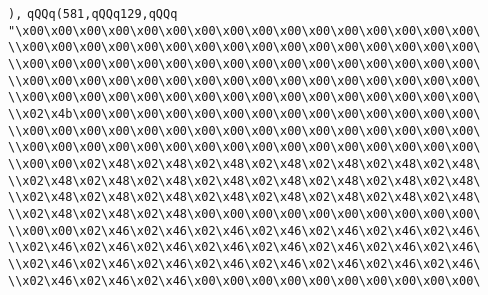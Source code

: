 \verb|),|\newline
\verb|qQQq(581,qQQq129,qQQq|\newline
\verb|"\x00\x00\x00\x00\x00\x00\x00\x00\x00\x00\x00\x00\x00\x00\x00\x00\|\newline
\verb|\\x00\x00\x00\x00\x00\x00\x00\x00\x00\x00\x00\x00\x00\x00\x00\x00\|\newline
\verb|\\x00\x00\x00\x00\x00\x00\x00\x00\x00\x00\x00\x00\x00\x00\x00\x00\|\newline
\verb|\\x00\x00\x00\x00\x00\x00\x00\x00\x00\x00\x00\x00\x00\x00\x00\x00\|\newline
\verb|\\x00\x00\x00\x00\x00\x00\x00\x00\x00\x00\x00\x00\x00\x00\x00\x00\|\newline
\verb|\\x02\x4b\x00\x00\x00\x00\x00\x00\x00\x00\x00\x00\x00\x00\x00\x00\|\newline
\verb|\\x00\x00\x00\x00\x00\x00\x00\x00\x00\x00\x00\x00\x00\x00\x00\x00\|\newline
\verb|\\x00\x00\x00\x00\x00\x00\x00\x00\x00\x00\x00\x00\x00\x00\x00\x00\|\newline
\verb|\\x00\x00\x02\x48\x02\x48\x02\x48\x02\x48\x02\x48\x02\x48\x02\x48\|\newline
\verb|\\x02\x48\x02\x48\x02\x48\x02\x48\x02\x48\x02\x48\x02\x48\x02\x48\|\newline
\verb|\\x02\x48\x02\x48\x02\x48\x02\x48\x02\x48\x02\x48\x02\x48\x02\x48\|\newline
\verb|\\x02\x48\x02\x48\x02\x48\x00\x00\x00\x00\x00\x00\x00\x00\x00\x00\|\newline
\verb|\\x00\x00\x02\x46\x02\x46\x02\x46\x02\x46\x02\x46\x02\x46\x02\x46\|\newline
\verb|\\x02\x46\x02\x46\x02\x46\x02\x46\x02\x46\x02\x46\x02\x46\x02\x46\|\newline
\verb|\\x02\x46\x02\x46\x02\x46\x02\x46\x02\x46\x02\x46\x02\x46\x02\x46\|\newline
\verb|\\x02\x46\x02\x46\x02\x46\x00\x00\x00\x00\x00\x00\x00\x00\x00\x00\|\newline
